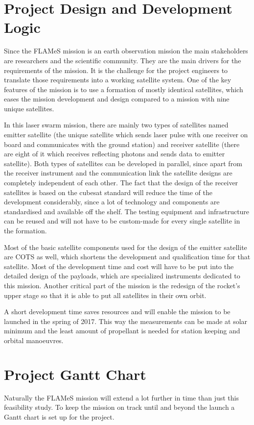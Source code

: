 \section{Project Design and Development Logic}
\label{frPMgantt}
Since the \ac{FLAMeS} mission is an earth observation mission the main stakeholders are researchers and the scientific community. They are the main drivers for the requirements of the mission. It is the challenge for the project engineers to translate those requirements into a working satellite system. One of the key features of the mission is to use a formation of mostly identical satellites, which eases the mission development and design compared to a mission with nine unique satellites. 

In this \acs{laser} swarm mission, there are mainly two types of satellites named emitter satellite (the unique satellite which sends laser pulse with one receiver on board and communicates with the ground station) and receiver satellite (there are eight of it which receives reflecting photons and sends data to emitter satellite). Both types of satellites can be developed in parallel, since apart from the receiver instrument and the communication link the satellite designs are completely independent of each other. The fact that the design of the receiver satellites is based on the cubesat standard will reduce the time of the development considerably, since a lot of technology and components are standardised and available off the shelf. The testing equipment and infrastructure can be reused and will not have to be custom-made for every single satellite in the formation. 

Most of the basic satellite components used for the design of the emitter satellite are \ac{COTS} as well, which shortens the development and qualification time for that satellite. Most of the development time and cost will have to be put into the detailed design of the payloads, which are specialized instruments dedicated to this mission. Another critical part of the mission is the redesign of the rocket's upper stage so that it is able to put all satellites in their own orbit.

A short development time saves resources and will enable the mission to be launched in the spring of 2017. This way the measurements can be made at solar minimum and the least amount of propellant is needed for station keeping and orbital manoeuvres.

\section{Project Gantt Chart}
Naturally the \ac{FLAMeS} mission will extend a lot further in time than just this feasibility study. To keep the mission on track until and beyond the launch a Gantt chart is set up for the project.

